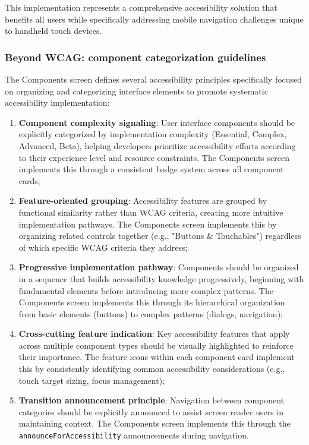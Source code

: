 This implementation represents a comprehensive accessibility solution that benefits all users while specifically addressing mobile navigation challenges unique to handheld touch devices.

\subsubsection{Beyond WCAG: component categorization guidelines}

The Components screen defines several accessibility principles specifically focused on organizing and categorizing interface elements to promote systematic accessibility implementation:

\begin{enumerate}
    \item \textbf{Component complexity signaling}: User interface components should be explicitly categorized by implementation complexity (Essential, Complex, Advanced, Beta), helping developers prioritize accessibility efforts according to their experience level and resource constraints. The Components screen implements this through a consistent badge system across all component cards;
    
    \item \textbf{Feature-oriented grouping}: Accessibility features are grouped by functional similarity rather than WCAG criteria, creating more intuitive implementation pathways. The Components screen implements this by organizing related controls together (e.g., "Buttons \& Touchables") regardless of which specific WCAG criteria they address;
    
    \item \textbf{Progressive implementation pathway}: Components should be organized in a sequence that builds accessibility knowledge progressively, beginning with fundamental elements before introducing more complex patterns. The Components screen implements this through its hierarchical organization from basic elements (buttons) to complex patterns (dialogs, navigation);
    
    \item \textbf{Cross-cutting feature indication}: Key accessibility features that apply across multiple component types should be visually highlighted to reinforce their importance. The feature icons within each component card implement this by consistently identifying common accessibility considerations (e.g., touch target sizing, focus management);
    
    \item \textbf{Transition announcement principle}: Navigation between component categories should be explicitly announced to assist screen reader users in maintaining context. The Components screen implements this through the \texttt{announceForAccessibility} announcements during navigation.
\end{enumerate}

